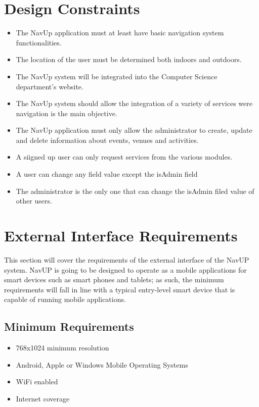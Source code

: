 \documentclass[12pt,a4paper]{article}
\begin{document}


\tableofcontents
\newpage

\section{Design Constraints}
	\begin{itemize}
		\item The NavUp application must at least have basic navigation system functionalities.
		\item The location  of the user must be determined both indoors and outdoors.
		\item The NavUp system will be integrated into the Computer Science department's website.
		\item The NavUp system should allow the integration of a variety of services were navigation is the main objective.
		\item The NavUp application must only allow the administrator to create, update and delete information about events, venues and activities.
		\item A siigned up user can only request services from the various modules.
		\item A user can change any field value except the isAdmin field
		\item The administrator is the only one that can change the isAdmin filed value of other users.
 
		
	\end{itemize}
    
\section{External Interface Requirements}
This section will cover the requirements of the external interface of the NavUP system. NavUP is going to be designed to operate as a mobile applications for smart devices such as smart phones and tablets; as such, the minimum requirements will fall in line with a typical entry-level smart device that is capable of running mobile applications.\newline

    \subsection{Minimum Requirements}
        \begin{itemize}
            \item 768x1024 minimum resolution
            \item Android, Apple or Windows Mobile Operating Systems
            \item WiFi enabled
            \item Internet coverage
        \end{itemize}
     
\end{document}
